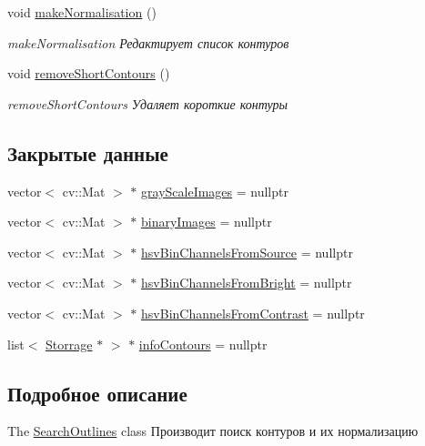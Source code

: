 \begin{DoxyCompactItemize}
void \hyperlink{class_search_outlines_a09da9c6586707297e2012403a497c6be}{make\+Normalisation} ()
\begin{DoxyCompactList}\small\item\em make\+Normalisation Редактирует список контуров \end{DoxyCompactList}\item 
void \hyperlink{class_search_outlines_ae2be53580b1029487fb5e5e2ab6c49a3}{remove\+Short\+Contours} ()
\begin{DoxyCompactList}\small\item\em remove\+Short\+Contours Удаляет короткие контуры \end{DoxyCompactList}\end{DoxyCompactItemize}
\subsection*{Закрытые данные}
\begin{DoxyCompactItemize}
\item 
vector$<$ cv\+::\+Mat $>$ $\ast$ \hyperlink{class_search_outlines_a2284f3f55022613e11f2d023a6b76e07}{gray\+Scale\+Images} = nullptr
\item 
vector$<$ cv\+::\+Mat $>$ $\ast$ \hyperlink{class_search_outlines_ad32573709b7db29f00e5444110b37d23}{binary\+Images} = nullptr
\item 
vector$<$ cv\+::\+Mat $>$ $\ast$ \hyperlink{class_search_outlines_a455efed931c502f14dbf88c87974214d}{hsv\+Bin\+Channels\+From\+Source} = nullptr
\item 
vector$<$ cv\+::\+Mat $>$ $\ast$ \hyperlink{class_search_outlines_a1eb23566d056c92a441067d8c9cd03ae}{hsv\+Bin\+Channels\+From\+Bright} = nullptr
\item 
vector$<$ cv\+::\+Mat $>$ $\ast$ \hyperlink{class_search_outlines_a236b9910b73900271297548d3744d506}{hsv\+Bin\+Channels\+From\+Contrast} = nullptr
\item 
list$<$ \hyperlink{class_storrage}{Storrage} $\ast$ $>$ $\ast$ \hyperlink{class_search_outlines_a1b1d7e6dd5c6c2b30c397f9f6d712dd1}{info\+Contours} = nullptr
\end{DoxyCompactItemize}


\subsection{Подробное описание}
The \hyperlink{class_search_outlines}{Search\+Outlines} class Производит поиск контуров и их нормализацию 

